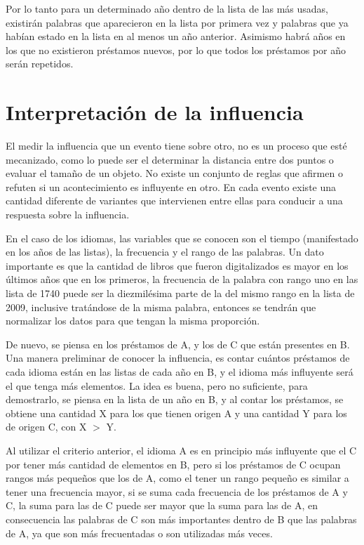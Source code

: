 Por lo tanto para un determinado año dentro de la lista de las más usadas, existirán palabras que aparecieron en la lista por primera vez y palabras que ya habían estado en la lista en al menos un año anterior.  Asimismo  habrá años en los que no existieron préstamos nuevos,  por lo que todos los préstamos por año serán repetidos.




\newpage
\section{Interpretación de la influencia}

El medir la influencia que un evento tiene sobre otro, no es un proceso que esté mecanizado, como lo puede ser el determinar la distancia entre dos puntos o evaluar el tamaño de un objeto.  No existe un conjunto de reglas que afirmen o refuten si un acontecimiento es influyente en otro. En cada evento existe una cantidad diferente de variantes que intervienen entre ellas para  conducir a una respuesta sobre la influencia. 

En el caso de los idiomas, las variables que se conocen son el tiempo (manifestado en los años de las listas), la frecuencia y el rango de las palabras.  Un dato importante es que la cantidad de libros que fueron digitalizados es mayor en los últimos años que en los primeros,  la frecuencia de la palabra con rango uno en las lista de 1740 puede ser la diezmilésima parte de la del mismo rango en la lista de 2009, inclusive tratándose de la misma palabra,  entonces se tendrán que normalizar los datos para que tengan la misma proporción. 

De nuevo, se piensa en los préstamos de A, y los de C que están presentes en B.  Una manera preliminar de conocer la influencia, es contar cuántos préstamos de cada idioma están en las listas de cada año en B,  y el idioma más influyente será el que tenga más elementos. La idea es buena, pero no suficiente, para demostrarlo, se piensa en la lista de un año en B,  y al contar los préstamos, se obtiene una cantidad X para los que tienen origen A y  una cantidad Y para los de origen C,  con X $>$ Y. 

Al utilizar el criterio anterior,  el idioma A es en principio más influyente que el C por tener más cantidad de elementos en B, pero si los préstamos de C ocupan rangos más pequeños que los de A, como el tener un rango pequeño es similar a tener una frecuencia mayor,  si se suma cada frecuencia  de los préstamos de A y C,  la suma para las de C puede ser mayor que la suma para las de A, en consecuencia las palabras de C son más importantes dentro de B que las palabras de A, ya que son más frecuentadas o son utilizadas más veces.   

